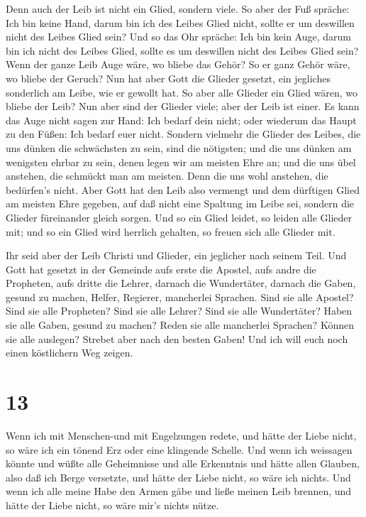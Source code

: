  Denn auch der Leib ist nicht ein Glied, sondern viele.
 So aber der Fuß spräche: Ich bin keine Hand, darum bin ich
des Leibes Glied nicht, sollte er um deswillen nicht des Leibes Glied
sein?  Und so das Ohr spräche: Ich bin kein Auge, darum bin
ich nicht des Leibes Glied, sollte es um deswillen nicht des Leibes
Glied sein?  Wenn der ganze Leib Auge wäre, wo bliebe das
Gehör? So er ganz Gehör wäre, wo bliebe der Geruch?  Nun
hat aber Gott die Glieder gesetzt, ein jegliches sonderlich am Leibe,
wie er gewollt hat.  So aber alle Glieder ein Glied wären,
wo bliebe der Leib?  Nun aber sind der Glieder viele; aber
der Leib ist einer.  Es kann das Auge nicht sagen zur Hand:
Ich bedarf dein nicht; oder wiederum das Haupt zu den Füßen: Ich bedarf
euer nicht.  Sondern vielmehr die Glieder des Leibes, die
uns dünken die schwächsten zu sein, sind die nötigsten; 
und die uns dünken am wenigsten ehrbar zu sein, denen legen wir am
meisten Ehre an; und die uns übel anstehen, die schmückt man am meisten.
 Denn die uns wohl anstehen, die bedürfen's nicht. Aber
Gott hat den Leib also vermengt und dem dürftigen Glied am meisten Ehre
gegeben,  auf daß nicht eine Spaltung im Leibe sei, sondern
die Glieder füreinander gleich sorgen.  Und so ein Glied
leidet, so leiden alle Glieder mit; und so ein Glied wird herrlich
gehalten, so freuen sich alle Glieder mit.

 Ihr seid aber der Leib Christi und Glieder, ein jeglicher
nach seinem Teil.  Und Gott hat gesetzt in der Gemeinde
aufs erste die Apostel, aufs andre die Propheten, aufs dritte die
Lehrer, darnach die Wundertäter, darnach die Gaben, gesund zu machen,
Helfer, Regierer, mancherlei Sprachen.  Sind sie alle
Apostel? Sind sie alle Propheten? Sind sie alle Lehrer? Sind sie alle
Wundertäter?  Haben sie alle Gaben, gesund zu machen? Reden
sie alle mancherlei Sprachen? Können sie alle auslegen? 
Strebet aber nach den besten Gaben! Und ich will euch noch einen
köstlichern Weg zeigen.

\hypertarget{section-12}{%
\section{13}\label{section-12}}

 Wenn ich mit Menschen-und mit Engelzungen redete, und hätte
der Liebe nicht, so wäre ich ein tönend Erz oder eine klingende Schelle.
 Und wenn ich weissagen könnte und wüßte alle Geheimnisse
und alle Erkenntnis und hätte allen Glauben, also daß ich Berge
versetzte, und hätte der Liebe nicht, so wäre ich nichts. 
Und wenn ich alle meine Habe den Armen gäbe und ließe meinen Leib
brennen, und hätte der Liebe nicht, so wäre mir's nichts nütze.

